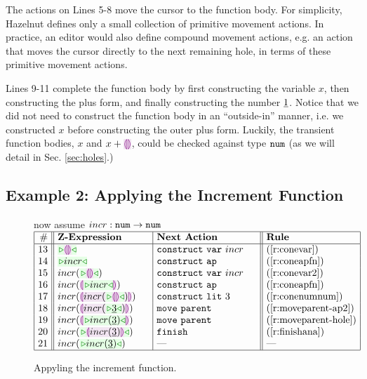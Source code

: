 The actions on Lines 5-8 move the cursor to the function body. For simplicity, Hazelnut defines only a small collection of primitive movement actions. In practice, an editor would also define compound movement actions, e.g. an action that moves the cursor directly to the next remaining hole, in terms of these primitive movement actions.

Lines 9-11 complete the function body by first constructing the variable $x$, then  constructing the plus form, and finally constructing the number $\underline{1}$. Notice that we did not need to construct the function body in an ``outside-in'' manner, i.e. we constructed $x$ before constructing the outer plus form. Luckily, the transient function bodies, $x$ and $x + \hhole{}$, could be checked against type $\texttt{num}$ (as we will detail in Sec. \ref{sec:holes}.)

\subsection{Example 2: Applying the Increment Function}

\begin{figure}[t!]
\begin{center}
\colorbox{light-gray}{\hspace{53px} now assume $incr : \texttt{num} \rightarrow \texttt{num}$ \hspace{54px}}
$\arraycolsep=4px
\begin{array}{|r||l|l||l|l|}
\hline
\# & \textbf{Z-Expression} & 
\textbf{Next Action} & \textbf{Rule}
\\
\hline
13 &
\zwsel{\hhole{}} & 
\aConstruct{\fvar{incr}} \hphantom{~\,\,~~}& 
\text{(\ref{r:conevar})}
\\ 14 & 
\zwsel{incr} & 
\aConstruct{\fap} & 
\text{(\ref{r:coneapfn})}
\\ 15 & 
incr(\zwsel{\hhole{}}) & 
\aConstruct{\fvar{incr}} & 
\text{(\ref{r:conevar2})}
\\ 16 & 
incr(\hhole{\zwsel{incr}}) & 
\aConstruct{\fap} & 
\text{(\ref{r:coneapfn})}
\\ 17 & 
incr(\hhole{incr(\zwsel{\hhole{}})}) \hphantom{~~~~} & 
\aConstruct{\fnumlit{3}} & 
\text{(\ref{r:conenumnum})}
\\ 18 & 
incr(\hhole{incr(\zwsel{\hnum{3}})}) & 
\aMove{\dParent}& 
\text{(\ref{r:moveparent-ap2})}
\\ 19 & 
incr(\hhole{\zwsel{incr(\hnum{3})}}) & 
\aMove{\dParent} & 
\text{(\ref{r:moveparent-hole})}
\\ 20 &
incr(\zwsel{\hhole{incr(\hnum{3})}})& 
\aFinish & 
\text{(\ref{r:finishana})}
\\ 21 & 
incr(\zwsel{incr(\hnum{3})}) & 
\textrm{---} & 
{\textrm{---}}
\\ \hline
\end{array}
$\end{center}\vspace{-6px}
\caption{Appyling the increment function.}
\label{fig:second-example}
\end{figure}

